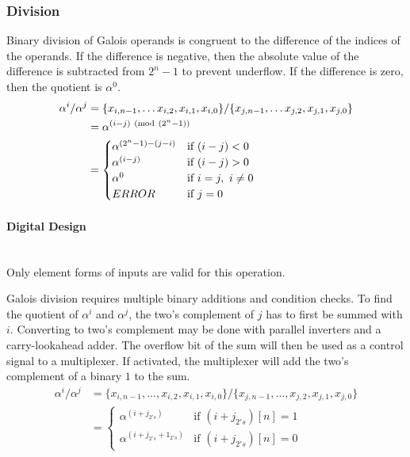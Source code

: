 \subsubsection{Division} Binary division of Galois operands is congruent to the
difference of the indices of the operands. If the difference is negative, then
the absolute value of the difference is subtracted from $2^{n}-1$ to prevent
underflow. If the difference is zero, then the quotient is $\alpha^{0}$.
    \begin{align*}
        \alpha^{i} / \alpha^{j} & = \{x_{i, n-1},\ldots x_{i, 2},x_{i,
        1},x_{i, 0}\} / \{x_{j, n-1}, \ldots x_{j, 2}, x_{j, 1}, x_{j, 0}\}
        \\
        & = \alpha^{(i - j) \ (\mathrm{mod}\ (2^{n}-1))} \\
        & = \begin{cases}
            \alpha^{(2^{n}-1) - (j - i)} & \text{if $(i - j) < 0$} \\
            \alpha^{(i - j)} & \text{if $(i - j) > 0$} \\
            \alpha^{0} & \text{if $i = j, \ i \neq 0$} \\
            ERROR & \text{if $j = 0$}
        \end{cases}
    \end{align*}

    \paragraph{{\small Digital Design}} \leavevmode \\ Only element forms of
    inputs are valid for this operation.

    Galois division requires multiple binary additions and condition checks. To
    find the quotient of $\alpha^{i}$ and $\alpha^{j}$, the two's complement of
    $j$ has to first be summed with $i$. Converting to two's complement may be
    done with parallel inverters and a carry-lookahead adder. The overflow bit
    of the sum will then be used as a control signal to a multiplexer. If
    activated, the multiplexer will add the two's complement of a binary $1$ to
    the sum.
\begin{align*}
    \alpha^{i} / \alpha^{j} & = \{ x_{i, n-1}, \ldots, x_{i, 2}, x_{i, 1},
    x_{i, 0} \} / \{x_{j, n-1}, \ldots, x_{j, 2}, x_{j, 1}, x_{j, 0}\} \\
    & = \begin{cases}
            \alpha^{(i + j_{2's})} & \text{if $(i+j_{2's})[n]=1$} \\
            \alpha^{(i + j_{2's} + 1_{2's})} & \text{if $(i+j_{2's})[n]=0$}
        \end{cases}
\end{align*}
